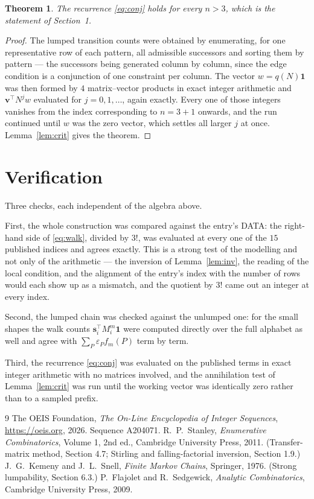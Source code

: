 \documentclass[11pt,a4paper]{article}
\theoremstyle{plain}
\newtheorem{theorem}{Theorem}
\theoremstyle{definition}
\begin{document}
\begin{theorem}
The recurrence \eqref{eq:conj} holds for every $n>3$, which is the statement of
Section~1.
\end{theorem}

\begin{proof}
The lumped transition counts were obtained by enumerating, for one representative row of
each pattern, all admissible successors and sorting them by pattern --- the successors being
generated column by column, since the edge condition is a conjunction of one constraint per
column. The vector $w=q(N)\mathbf{1}$ was then formed by $4$ matrix--vector products
in exact integer arithmetic and $\mathbf{v}^{\!\top}N^{j}w$ evaluated for
$j=0,1,\dots$, again exactly. Every one of those integers vanishes from the index
corresponding to $n=3+1$ onwards, and the run continued until $w$ was the zero vector,
which settles all larger $j$ at once. Lemma~\ref{lem:crit} gives the theorem.
\end{proof}

\section{Verification}

Three checks, each independent of the algebra above.

First, the whole construction was compared against the entry's DATA: the right-hand side of
\eqref{eq:walk}, divided by $3!$, was evaluated at every one of the $15$
published indices and agrees exactly. This is a strong test of the modelling and not only of
the arithmetic --- the inversion of Lemma~\ref{lem:inv}, the reading of the local
condition, and the alignment of the entry's index with the number of rows would each
show up as a mismatch, and the quotient by $3!$ came out an integer at every index.

Second, the lumped chain was checked against the unlumped one: for the small shapes the walk
counts $\mathbf{s}_i^{\!\top}M_i^{m}\mathbf{1}$ were computed directly over the full
alphabet as well and agree with $\sum_P\varepsilon_Pf_m(P)$ term by term.

Third, the recurrence \eqref{eq:conj} was evaluated on the published terms in exact integer
arithmetic with no matrices involved, and the annihilation test of Lemma~\ref{lem:crit} was
run until the working vector was identically zero rather than to a sampled prefix.

\begin{thebibliography}{9}
 The OEIS Foundation, \emph{The On-Line Encyclopedia of Integer
Sequences}, \url{https://oeis.org}, 2026. Sequence A204071.
 R.~P.~Stanley, \emph{Enumerative Combinatorics}, Volume 1, 2nd ed.,
Cambridge University Press, 2011. (Transfer-matrix method, Section 4.7; Stirling and
falling-factorial inversion, Section 1.9.)
 J.~G.~Kemeny and J.~L.~Snell, \emph{Finite Markov Chains}, Springer,
1976. (Strong lumpability, Section 6.3.)
 P.~Flajolet and R.~Sedgewick, \emph{Analytic Combinatorics}, Cambridge
University Press, 2009.
\end{thebibliography}
\end{document}
